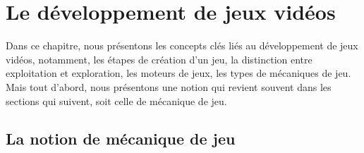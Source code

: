 \chapter{Le développement de jeux vidéos}

\label{chap.dev_jv}
Dans ce chapitre, nous pr\'esentons les concepts cl\'es
li\'es au d\'eveloppement de jeux vid\'eos, notamment, les \'etapes de
cr\'eation d'un jeu, la distinction entre exploitation et exploration,
les moteurs de jeux, les types de mécaniques de jeu.
%
Mais tout d'abord, nous pr\'esentons une notion qui revient
souvent dans les sections qui suivent, soit celle de mécanique de jeu.



\section{La notion de mécanique de jeu}


